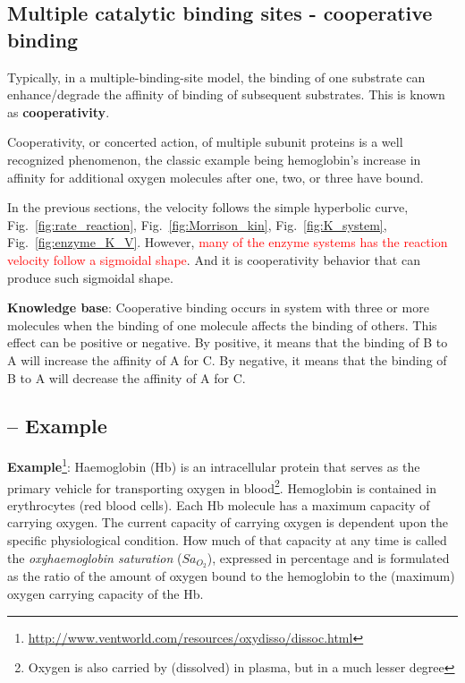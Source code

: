 \subsection{Multiple catalytic binding sites - cooperative binding}
\label{sec:dissociation-curve}
\label{sec:cooperativity}

Typically, in a multiple-binding-site model, the binding of one
substrate can enhance/degrade the affinity of binding of subsequent
substrates. This is known as {\bf cooperativity}. 

Cooperativity, or concerted action, of multiple subunit proteins is a well
recognized phenomenon, the classic example being hemoglobin's increase in
affinity for additional oxygen molecules after one, two, or three have bound. 

In the previous sections, the velocity follows the simple hyperbolic curve,
Fig.~\ref{fig:rate_reaction}, Fig.~\ref{fig:Morrison_kin},
Fig.~\ref{fig:K_system}, Fig.~\ref{fig:enzyme_K_V}. However,
\textcolor{red}{many of the enzyme systems has the reaction velocity follow a
sigmoidal shape}. And it is cooperativity behavior that can produce such
sigmoidal shape.

{\bf Knowledge base}: Cooperative binding occurs in system with three
or more molecules when the binding of one molecule affects the binding
of others. This effect can be positive or negative. By positive, it
means that the binding of B to A will increase the affinity of A for
C. By negative, it means that the binding of B to A will decrease the
affinity of A for C. 

\subsection{-- Example}
\label{sec:example}

{\bf Example}\footnote{\url{http://www.ventworld.com/resources/oxydisso/dissoc.html}}:
Haemoglobin (Hb) is an intracellular protein that serves as the primary vehicle for transporting oxygen in
blood\footnote{Oxygen is also carried by (dissolved) in plasma, but in
  a much lesser degree}.
Hemoglobin is contained in erythrocytes (red blood cells).  Each Hb
molecule has a maximum capacity of carrying oxygen. The current
capacity of carrying oxygen  is dependent upon the specific
physiological condition. How much of that capacity at any time is 
called the {\it  oxyhaemoglobin saturation} ($Sa_{O_2}$), expressed in
percentage and is formulated as the ratio of the amount of oxygen
bound to the hemoglobin to the (maximum) oxygen carrying capacity of the
Hb. 

